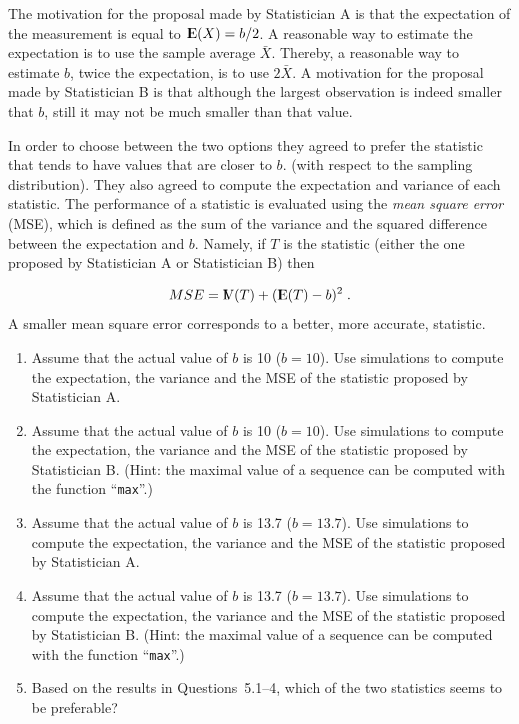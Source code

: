 \documentclass[]{krantz}
\newcommand{\Expec}{{\rm I\kern-.3em E}}
\newcommand{\Var}{{\rm I\kern-.3em V}}
\theoremstyle{definition}
\theoremstyle{definition}
\theoremstyle{definition}
\theoremstyle{remark}
\begin{document}
The motivation for the proposal made by Statistician A is that the
expectation of the measurement is equal to \(\Expec(X) = b/2\). A
reasonable way to estimate the expectation is to use the sample average
\(\bar X\). Thereby, a reasonable way to estimate \(b\), twice the
expectation, is to use \(2 \bar X\). A motivation for the proposal made by
Statistician B is that although the largest observation is indeed
smaller that \(b\), still it may not be much smaller than that value.

In order to choose between the two options they agreed to prefer the
statistic that tends to have values that are closer to \(b\). (with
respect to the sampling distribution). They also agreed to compute the
expectation and variance of each statistic. The performance of a
statistic is evaluated using the \emph{mean square error} (MSE), which is
defined as the sum of the variance and the squared difference between
the expectation and \(b\). Namely, if \(T\) is the statistic (either the one
proposed by Statistician A or Statistician B) then

\[MSE = \Var(T) + (\Expec(T) - b)^2\;.\] A smaller mean square error
corresponds to a better, more accurate, statistic.

\begin{enumerate}
\def\labelenumi{\arabic{enumi}.}
\item
  Assume that the actual value of \(b\) is 10 (\(b=10\)). Use simulations
  to compute the expectation, the variance and the MSE of the
  statistic proposed by Statistician A.
\item
  Assume that the actual value of \(b\) is 10 (\(b=10\)). Use simulations
  to compute the expectation, the variance and the MSE of the
  statistic proposed by Statistician B. (Hint: the maximal value of a
  sequence can be computed with the function ``\texttt{max}''.)
\item
  Assume that the actual value of \(b\) is 13.7 (\(b=13.7\)). Use
  simulations to compute the expectation, the variance and the MSE of
  the statistic proposed by Statistician A.
\item
  Assume that the actual value of \(b\) is 13.7 (\(b=13.7\)). Use
  simulations to compute the expectation, the variance and the MSE of
  the statistic proposed by Statistician B. (Hint: the maximal value
  of a sequence can be computed with the function ``\texttt{max}''.)
\item
  Based on the results in Questions~5.1--4, which of the two statistics
  seems to be preferable?
\end{enumerate}
\end{document}
